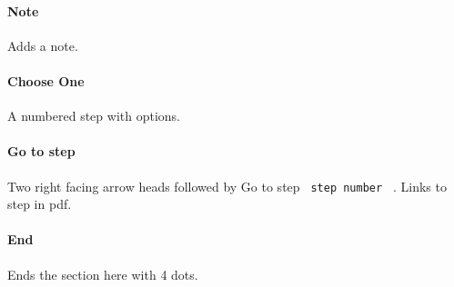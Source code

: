 \paragraph{Note}\label{note}

Adds a note.

\begin{Shaded}
\begin{Highlighting}[]
\end{Highlighting}
\end{Shaded}

\paragraph{Choose One}\label{choose-one}

A numbered step with options.

\begin{Shaded}
\begin{Highlighting}[]
\NormalTok{ \#choose{-}one[}
\NormalTok{  ]}
\end{Highlighting}
\end{Shaded}

\paragraph{Go to step}\label{go-to-step}

Two right facing arrow heads followed by Go to step
\texttt{\ step\ number\ } . Links to step in pdf.

\begin{Shaded}
\begin{Highlighting}[]
\end{Highlighting}
\end{Shaded}

\paragraph{End}\label{end}

Ends the section here with 4 dots.

\begin{Shaded}
\begin{Highlighting}[]
\end{Highlighting}
\end{Shaded}

